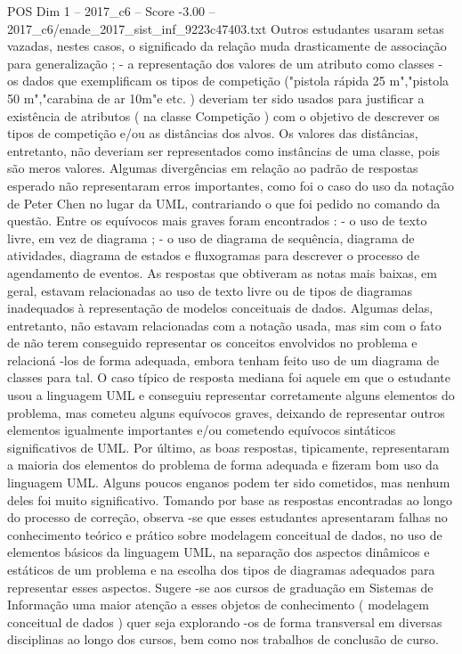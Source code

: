 \begin{textsample}{POS Dim 1 – 2017\_c6 – Score -3.00 – 2017\_c6/enade\_2017\_sist\_inf\_9223c47403.txt}
Outros estudantes usaram setas vazadas, nestes casos, o significado da relação muda drasticamente de associação para generalização ; - a representação dos valores de um atributo como classes - os dados que exemplificam os tipos de competição ("pistola rápida 25 m","pistola 50 m","carabina de ar 10m"e etc. ) deveriam ter sido usados para justificar a existência de atributos ( na classe Competição ) com o objetivo de descrever os tipos de competição e/ou as distâncias dos alvos.
Os valores das distâncias, entretanto, não deveriam ser representados como instâncias de uma classe, pois são meros valores.
Algumas divergências em relação ao padrão de respostas esperado não representaram erros importantes, como foi o caso do uso da notação de Peter Chen no lugar da UML, contrariando o que foi pedido no comando da questão.
Entre os equívocos mais graves foram encontrados : - o uso de texto livre, em vez de diagrama ; - o uso de diagrama de sequência, diagrama de atividades, diagrama de estados e fluxogramas para descrever o processo de agendamento de eventos.
As respostas que obtiveram as notas mais baixas, em geral, estavam relacionadas ao uso de texto livre ou de tipos de diagramas inadequados à representação de modelos conceituais de dados.
Algumas delas, entretanto, não estavam relacionadas com a notação usada, mas sim com o fato de não terem conseguido representar os conceitos envolvidos no problema e relacioná -los de forma adequada, embora tenham feito uso de um diagrama de classes para tal.
O caso típico de resposta mediana foi aquele em que o estudante usou a linguagem UML e conseguiu representar corretamente alguns elementos do problema, mas cometeu alguns equívocos graves, deixando de representar outros elementos igualmente importantes e/ou cometendo equívocos sintáticos significativos de UML.
Por último, as boas respostas, tipicamente, representaram a maioria dos elementos do problema de forma adequada e fizeram bom uso da linguagem UML.
Alguns poucos enganos podem ter sido cometidos, mas nenhum deles foi muito significativo.
Tomando por base as respostas encontradas ao longo do processo de correção, observa -se que esses estudantes apresentaram falhas no conhecimento teórico e prático sobre modelagem conceitual de dados, no uso de elementos básicos da linguagem UML, na separação dos aspectos dinâmicos e estáticos de um problema e na escolha dos tipos de diagramas adequados para representar esses aspectos.
Sugere -se aos cursos de graduação em Sistemas de Informação uma maior atenção a esses objetos de conhecimento ( modelagem conceitual de dados ) quer seja explorando -os de forma transversal em diversas disciplinas ao longo dos cursos, bem como nos trabalhos de conclusão de curso.

\end{textsample}
